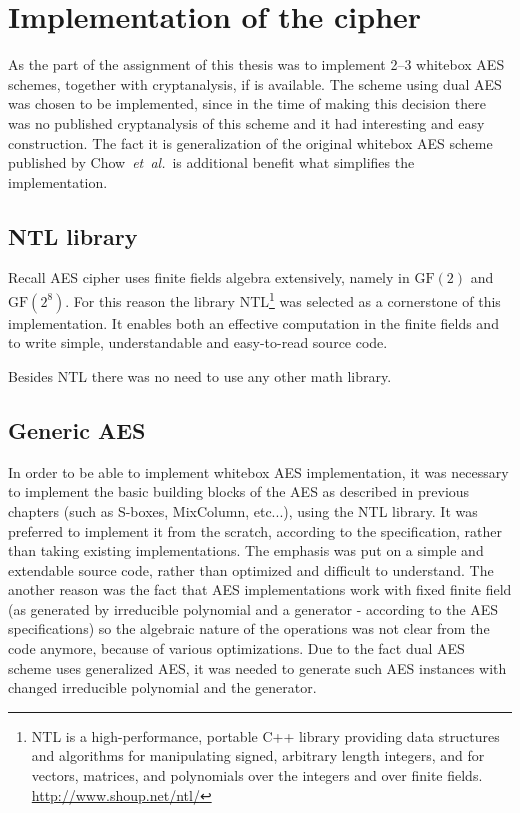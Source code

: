 \documentclass[11pt,oneside,final]{fithesis2}
\newcommand{\gfe}{\ensuremath{\text{GF}\left(2^8\right)}}
\newcommand{\gf}{\ensuremath{\text{GF}\left(2\right)}}
\newcommand{\eal}{\emph{et~al.}}
\begin{document}
    \section{Implementation of the cipher}
    As the part of the assignment of this thesis was to implement 2--3 whitebox AES schemes, together with cryptanalysis, if is available. 
    The scheme using dual AES was chosen to be implemented, since in the time of making this decision there was no published cryptanalysis
    of this scheme and it had interesting and easy construction. The fact it is generalization of the original whitebox AES scheme
    published by Chow~\eal~is additional benefit what simplifies the implementation.
    
    \subsection{NTL library}
    Recall AES cipher uses finite fields algebra extensively, namely in $\gf$ and $\gfe$. For this reason the library
    NTL\footnote{NTL is a high-performance, portable C++ library providing data structures and algorithms for manipulating signed, arbitrary length integers, 
	and for vectors, matrices, and polynomials over the integers and over finite fields. \url{http://www.shoup.net/ntl/}} was selected
    as a cornerstone of this implementation. It enables both an effective computation in the finite fields and to write simple, understandable and easy-to-read
    source code. 
    
    Besides NTL there was no need to use any other math library.
    
    \subsection{Generic AES}
    In order to be able to implement whitebox AES implementation, it was necessary to implement the basic building blocks of the AES as described in
    previous chapters (such as S-boxes, MixColumn, etc...), using the NTL library. It was preferred to implement it from the scratch, according to the specification,
    rather than taking existing implementations. The emphasis was put on a simple and extendable source code, rather than optimized and difficult to understand. 
    The another reason was the fact that AES implementations work with fixed finite field (as generated by irreducible polynomial and a generator - according 
    to the AES specifications) so the algebraic nature of the operations was not clear from the code anymore, because of various optimizations. Due to the fact
    dual AES scheme uses generalized AES, it was needed to generate such AES instances with changed irreducible polynomial and the generator. 
    
\end{document}
